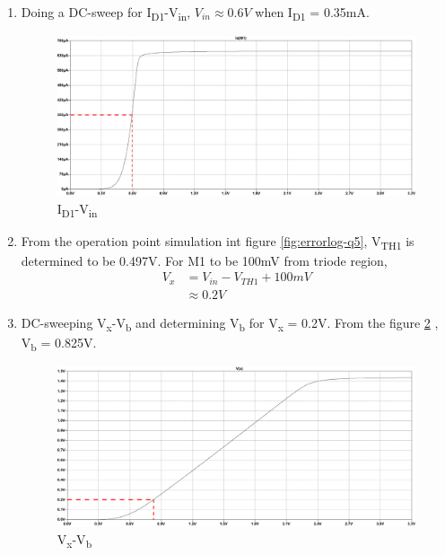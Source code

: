 \documentclass{article}
\begin{document}
\begin{enumerate}[(a)]
\begin{enumerate}
\begin{figure}[H]
\end{figure}
\item Doing a DC-sweep for I\textsubscript{D1}-V\textsubscript{in}, \(V_{in}\approx0.6V\) when I\textsubscript{D1} = 0.35mA.
\begin{figure}[H]
\centering
\includegraphics[width=.9\linewidth]{img/q5/id-vin.pdf}
\caption{\label{fig:id-vin-q5}I\textsubscript{D1}-V\textsubscript{in}}
\end{figure}
\item From the operation point simulation int figure \ref{fig:errorlog-q5}, V\textsubscript{TH1} is determined to be 0.497V. For M1 to be 100mV from triode region,
\begin{equation*}
\begin{aligned}
V_{x} &= V_{in} - V_{TH1} + 100mV \\
&\approx 0.2 V
\end{aligned}
\end{equation*}
\item DC-sweeping V\textsubscript{x}-V\textsubscript{b} and determining V\textsubscript{b} for V\textsubscript{x} = 0.2V. From the figure \ref{fig:vx-vb-q5} , V\textsubscript{b} = 0.825V.
\begin{figure}[H]
\centering
\includegraphics[width=.9\linewidth]{img/q5/vx-vin-q5.pdf}
\caption{\label{fig:vx-vb-q5}V\textsubscript{x}-V\textsubscript{b}}
\end{figure}
\end{enumerate}
\end{enumerate}
\end{document}
